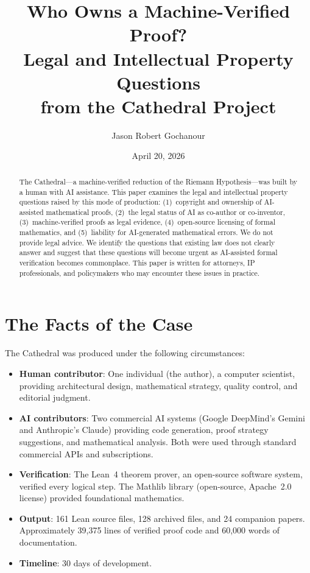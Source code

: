 \documentclass[11pt,a4paper]{article}
\title{%
  Who Owns a Machine-Verified Proof?\\
  Legal and Intellectual Property Questions\\
  from the Cathedral Project%
}
\author{
  Jason Robert Gochanour
}
\date{April 20, 2026}
\begin{document}
\maketitle

\begin{abstract}
The Cathedral---a machine-verified reduction of the Riemann
Hypothesis---was built by a human with AI assistance. This paper
examines the legal and intellectual property questions raised by
this mode of production: (1)~copyright and ownership of
AI-assisted mathematical proofs, (2)~the legal status of AI as
co-author or co-inventor, (3)~machine-verified proofs as legal
evidence, (4)~open-source licensing of formal mathematics, and
(5)~liability for AI-generated mathematical errors. We do not
provide legal advice. We identify the questions that existing law
does not clearly answer and suggest that these questions will
become urgent as AI-assisted formal verification becomes
commonplace. This paper is written for attorneys, IP professionals,
and policymakers who may encounter these issues in practice.
\end{abstract}

\tableofcontents

\section{The Facts of the Case}

The Cathedral was produced under the following circumstances:

\begin{itemize}
  \item \textbf{Human contributor}: One individual (the author),
    a computer scientist, providing architectural design,
    mathematical strategy, quality control, and editorial judgment.

  \item \textbf{AI contributors}: Two commercial AI systems
    (Google DeepMind's Gemini and Anthropic's Claude) providing
    code generation, proof strategy suggestions, and mathematical
    analysis. Both were used through standard commercial APIs and
    subscriptions.

  \item \textbf{Verification}: The Lean~4 theorem prover, an
    open-source software system, verified every logical step.
    The Mathlib library (open-source, Apache~2.0 license) provided
    foundational mathematics.

  \item \textbf{Output}: 161 Lean source files, 128 archived files,
    and 24 companion papers. Approximately 39,375 lines of
    verified proof code and 60,000 words of documentation.

  \item \textbf{Timeline}: 30 days of development.
\end{itemize}
\end{document}

